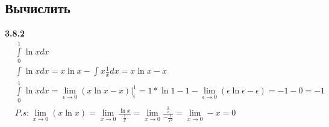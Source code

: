 \documentclass[a4paper, 12pt]{article}
\begin{document}
    \subsection{Вычислить}
    
    \textbf{3.8.2}
    \begin{align*}
    &\int\limits_0^1\ln xdx \\
    &\int \ln xdx = x\ln x - \int x\frac{1}{x}dx = x\ln x-x \\
    &\int\limits_0^1\ln xdx =\lim_{\epsilon \to 0} 
    (x\ln x - x)\Big|_\epsilon^1 = 
    1*\ln1 -1 - \lim_{\epsilon \to 0} \left( \epsilon \ln \epsilon - \epsilon \right)= 
    -1 - 0 = -1 \\
    & P.s:
    \lim\limits_{x \to 0}(x\ln x) = 
    \lim\limits_{x \to 0}\frac{\ln x}{\frac{1}{x}}= 
    \lim\limits_{x \to 0}\frac{\frac{1}{x}}{-\frac{1}{x^2}}= 
    \lim\limits_{x \to 0}-x = 0 \\
    \end{align*}
    
\end{document}
